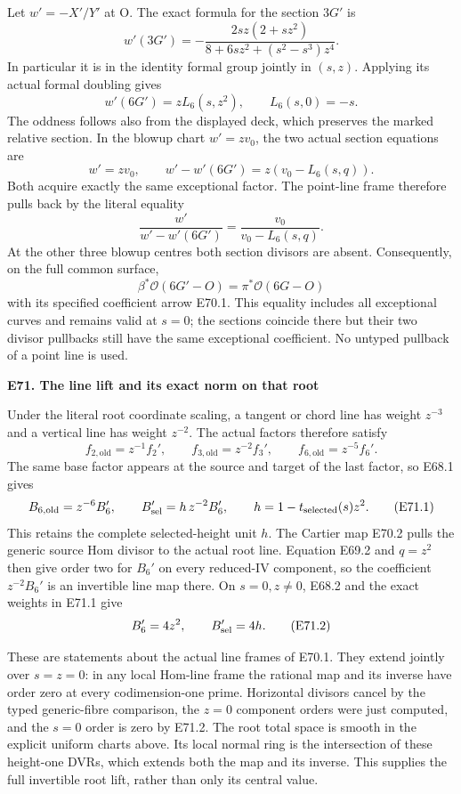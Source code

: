 Let \(w'=-X'/Y'\) at O. The exact formula for the section \(3G'\) is
\[
 w'(3G')=
 -\frac{2sz(2+sz^2)}
 {8+6sz^2+(s^2-s^3)z^4}.
\]
In particular it is in the identity formal group jointly in \((s,z)\).
Applying its actual formal doubling gives
\[
 w'(6G')=zL_6(s,z^2),\qquad L_6(s,0)=-s .
\]
The oddness follows also from the displayed deck, which preserves
the marked relative section. In the blowup chart \(w'=zv_0\),
the two actual section equations are
\[
 w'=zv_0,\qquad w'-w'(6G')=z(v_0-L_6(s,q)).
\]
Both acquire exactly the same exceptional factor. The point-line
frame therefore pulls back by the literal equality
\[
 \frac{w'}{w'-w'(6G')}=
 \frac{v_0}{v_0-L_6(s,q)}.                         \tag{E70.1}
\]
At the other three blowup centres both section divisors are absent.
Consequently, on the full common surface,
\[
 \beta^*\mathcal O(6G'-O)
       =\pi^*\mathcal O(6G-O)                     \tag{E70.2}
\]
with its specified coefficient arrow E70.1. This equality includes
all exceptional curves and remains valid at \(s=0\); the sections
coincide there but their two divisor pullbacks still have the same
exceptional coefficient. No untyped pullback of a point line is
used.

\par

\medskip\noindent\textbf{E71. The line lift and its exact norm on that root}

\par\nobreak

Under the literal root coordinate scaling, a tangent or chord line
has weight \(z^{-3}\) and a vertical line has weight \(z^{-2}\).
The actual factors therefore satisfy
\[
 f_{2,\mathrm{old}}=z^{-1}f_2',\qquad
 f_{3,\mathrm{old}}=z^{-2}f_3',\qquad
 f_{6,\mathrm{old}}=z^{-5}f_6'.
\]
The same base factor appears at the source and target of the last
factor, so E68.1 gives
\[
 B_{6,\mathrm{old}}=z^{-6}B_6',\qquad
 B_{\rm sel}'=h\,z^{-2}B_6',
 \qquad h=1-t_{\rm selected}(s)z^2.                \tag{E71.1}
\]
This retains the complete selected-height unit \(h\).
The Cartier map E70.2 pulls the generic source Hom divisor to
the actual root line. Equation E69.2 and \(q=z^2\) then give
order two for \(B_6'\) on every reduced-IV component, so the
coefficient \(z^{-2}B_6'\) is an invertible line map there.
On \(s=0,z\ne0\), E68.2 and the exact weights in E71.1 give
\[
 B_6'=4z^2,\qquad B_{\rm sel}'=4h.                 \tag{E71.2}
\]

These are statements about the actual line frames of E70.1.
They extend jointly over \(s=z=0\): in any local Hom-line frame
the rational map and its inverse have order zero at every
codimension-one prime. Horizontal divisors cancel by the typed
generic-fibre comparison, the \(z=0\) component orders were just
computed, and the \(s=0\) order is zero by E71.2. The root total
space is smooth in the explicit uniform charts above. Its local
normal ring is the intersection of these height-one DVRs, which
extends both the map and its inverse. This supplies the full
invertible root lift, rather than only its central value.

